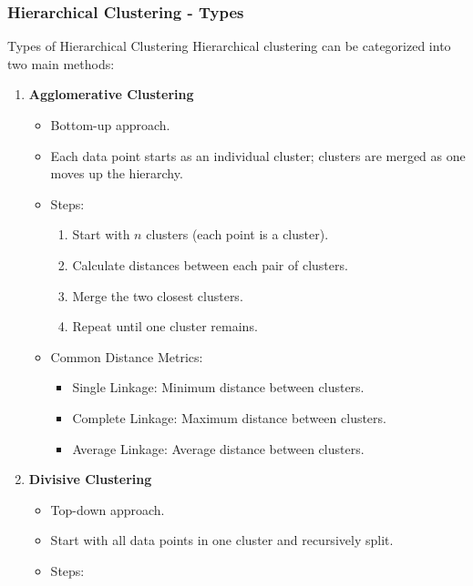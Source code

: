 \documentclass[aspectratio=169]{beamer}
\begin{document}
\begin{frame}[fragile]
    \frametitle{Hierarchical Clustering - Types}
    \begin{block}{Types of Hierarchical Clustering}
        Hierarchical clustering can be categorized into two main methods:
        \begin{enumerate}
            \item \textbf{Agglomerative Clustering}
                \begin{itemize}
                    \item Bottom-up approach.
                    \item Each data point starts as an individual cluster; clusters are merged as one moves up the hierarchy.
                    \item Steps:
                        \begin{enumerate}
                            \item Start with \( n \) clusters (each point is a cluster).
                            \item Calculate distances between each pair of clusters.
                            \item Merge the two closest clusters.
                            \item Repeat until one cluster remains.
                        \end{enumerate}
                    \item Common Distance Metrics:
                        \begin{itemize}
                            \item Single Linkage: Minimum distance between clusters.
                            \item Complete Linkage: Maximum distance between clusters.
                            \item Average Linkage: Average distance between clusters.
                        \end{itemize}
                \end{itemize}
            \item \textbf{Divisive Clustering}
                \begin{itemize}
                    \item Top-down approach.
                    \item Start with all data points in one cluster and recursively split.
                    \item Steps:

\end{itemize}
\end{enumerate}
\end{block}
\end{frame}
\end{document}
